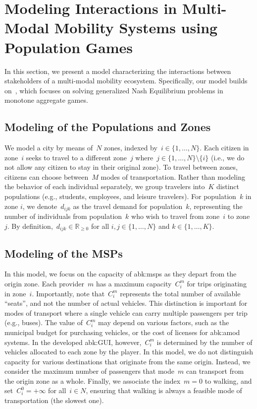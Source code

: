 \section{Modeling Interactions in Multi-Modal Mobility Systems using Population Games}
\label{sec:model}
In this section, we present a model characterizing the interactions between stakeholders of a multi-modal mobility ecosystem.
Specifically, our model builds on~\cite{belgioioso2021semi}, which focuses on solving generalized Nash Equilibrium problems in monotone aggregate games.

\subsection{Modeling of the Populations and Zones}
We model a city by means of~$N$ zones, indexed by~$i \in \{1, \dots, N\}$. 
Each citizen in zone~$i$ seeks to travel to a different zone~$j$ where~$j \in  \{1, \dots, N\} \setminus \{i\}$ (i.e., we do not allow any citizen to stay in their original zone).
To travel between zones, citizens can choose between~$M$ modes of transportation.
Rather than modeling the behavior of each individual separately, we group travelers into~$K$ distinct populations (e.g., students, employees, and leisure travelers).
For population~$k$ in zone $i$, we denote~$d_{ijk}$ as the travel demand for population~$k$, representing the number of individuals from population~$k$ who wish to travel from zone~$i$ to zone~$j$.
By definition,~$d_{ijk} \in \mathbb{R}_{\geq 0}$ for all $i,j \in \{1, \dots, N\}$ and $k \in \{1, \dots, K\}$.
\subsection{Modeling of the MSPs}
In this model, we focus on the capacity of \glspl{abk:msp} as they depart from the origin zone.
Each provider~$m$ has a maximum capacity~$C_i^m$ for trips originating in zone~$i$.
Importantly, note that~$C_i^m$  represents the total number of available ``seats'', and not the number of actual vehicles.
This distinction is important for modes of transport where a single vehicle can carry multiple passengers per trip (e.g., buses).
The value of~$C_i^m$ may depend on various factors, such as the municipal budget for purchasing vehicles, or the cost of licenses for \gls{abk:amod} systems.
In the developed \gls{abk:GUI}, however,~$C_i^m$ is determined by the number of vehicles allocated to each zone by the player.
In this model, we do not distinguish capacity for various destinations that originate from the same origin.
Instead, we consider the maximum number of passengers that mode~$m$ can transport from the origin zone as a whole.
Finally, we associate the index~$m=0$ to walking, and set~$C_i^0 = +\infty $ for all~$i \in N$, ensuring that walking is always a feasible mode of transportation (the slowest one). 
